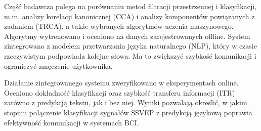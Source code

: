 \begin{abstracts}
  Część badawcza polega na porównaniu metod filtracji przestrzennej i klasyfikacji, m.in.
  analizy korelacji kanonicznej (CCA) i analizy komponentów powiązanych z zadaniem (TRCA),
  a także wybranych algorytmów uczenia maszynowego. Algorytmy wytrenowano i oceniono na
  danych zarejestrowanych offline. System zintegrowano z modelem przetwarzania języka
  naturalnego (NLP), który w czasie rzeczywistym podpowiada kolejne słowa. Ma to zwiększyć
  szybkość komunikacji i ograniczyć zmęczenie użytkownika.

  Działanie zintegrowanego systemu zweryfikowano w eksperymentach online. Oceniono
  dokładność klasyfikacji oraz szybkość transferu informacji (ITR) zarówno z predykcją
  tekstu, jak i bez niej. Wyniki pozwalają określić, w jakim stopniu połączenie
  klasyfikacji sygnałów SSVEP z predykcją językową poprawia efektywność komunikacji w
  systemach BCI.

\end{abstracts}